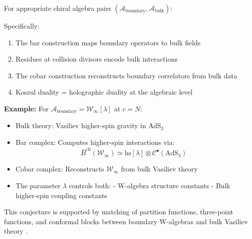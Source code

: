 \begin{conjecture}\label{conj:holographic-koszul}
For appropriate chiral algebra pairs $(\mathcal{A}_{\text{boundary}}, \mathcal{A}_{\text{bulk}})$:

\begin{center}
\end{center}

Specifically:
\begin{enumerate}
\item The bar construction maps boundary operators to bulk fields
\item Residues at collision divisors encode bulk interactions
\item The cobar construction reconstructs boundary correlators from bulk data
\item Koszul duality = holographic duality at the algebraic level
\end{enumerate}

\textbf{Example:} For $\mathcal{A}_{\text{boundary}} = \mathcal{W}_{\infty}[\lambda]$ at $c = N$:
\begin{itemize}
\item Bulk theory: Vasiliev higher-spin gravity in AdS$_3$
\item Bar complex: Computes higher-spin interactions via:
  $$\bar{B}^{\text{ch}}(\mathcal{W}_{\infty}) \simeq \text{hs}[\lambda] \otimes \mathcal{C}^{\bullet}(\text{AdS}_3)$$
\item Cobar complex: Reconstructs $\mathcal{W}_{\infty}$ from bulk Vasiliev theory
\item The parameter $\lambda$ controls both:
  - W-algebra structure constants
  - Bulk higher-spin coupling constants
\end{itemize}
\end{conjecture}

\begin{remark}
This conjecture is supported by matching of partition functions, three-point functions, and conformal blocks between boundary W-algebras and bulk Vasiliev theory \cite{Gaberdiel-Gopakumar}.
\end{remark}
